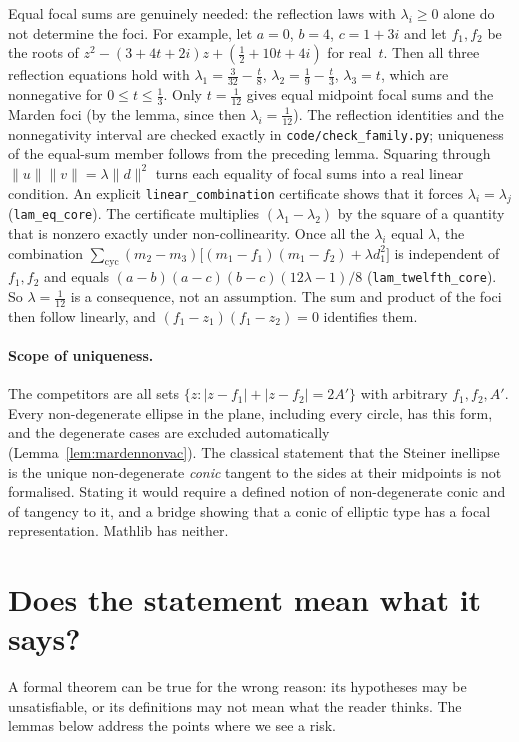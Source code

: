 \documentclass[11pt]{article}
\theoremstyle{remark}
\newcommand{\lean}[1]{\texttt{#1}}
\newcommand{\nm}[1]{\lVert #1\rVert}
\begin{document}
Equal focal sums are genuinely needed: the reflection laws with $\lambda_i\ge0$ alone do not
determine the foci. For example, let $a=0$, $b=4$, $c=1+3i$ and let $f_1,f_2$ be the roots of
$z^2-(3+4t+2i)z+(\frac12+10t+4i)$ for real~$t$. Then all three reflection equations hold with
$\lambda_1=\frac3{32}-\frac t8$, $\lambda_2=\frac19-\frac t3$, $\lambda_3=t$, which are
nonnegative for $0\le t\le\frac13$. Only $t=\frac1{12}$ gives equal midpoint focal sums and the
Marden foci (by the lemma, since then $\lambda_i=\frac1{12}$). The reflection identities and the nonnegativity interval are checked exactly in \texttt{code/check\_family.py}; uniqueness of the equal-sum member follows from the preceding lemma. Squaring through
$\nm u\nm v=\lambda\nm d^2$ turns each equality of focal sums into a real linear condition. An
explicit \lean{linear\_combination} certificate shows that it forces $\lambda_i=\lambda_j$
(\lean{lam\_eq\_core}). The certificate multiplies $(\lambda_1-\lambda_2)$ by the square of a quantity
that is nonzero exactly under non-collinearity. Once all the $\lambda_i$ equal $\lambda$, the combination
$\sum_{\mathrm{cyc}}(m_2-m_3)\bigl[(m_1-f_1)(m_1-f_2)+\lambda d_1^2\bigr]$ is independent of
$f_1,f_2$ and equals $(a-b)(a-c)(b-c)(12\lambda-1)/8$ (\lean{lam\_twelfth\_core}). So
$\lambda=\frac1{12}$ is a consequence, not an assumption. The sum and product of the foci then follow
linearly, and $(f_1-z_1)(f_1-z_2)=0$ identifies them.

\paragraph{Scope of uniqueness.} The competitors are all sets
$\{z:|z-f_1|+|z-f_2|=2A'\}$ with arbitrary $f_1,f_2,A'$. Every non-degenerate ellipse in the plane,
including every circle, has this form, and the degenerate cases are excluded automatically
(Lemma~\ref{lem:mardennonvac}). The classical statement that the Steiner inellipse is the unique
non-degenerate \emph{conic} tangent to the sides at their midpoints is not formalised. Stating it would require a
defined notion of non-degenerate conic and of tangency to it, and a bridge showing that a conic of elliptic type has a focal
representation. Mathlib has neither.

\section{Does the statement mean what it says?}\label{sec:correct}

A formal theorem can be true for the wrong reason: its hypotheses may be unsatisfiable, or its
definitions may not mean what the reader thinks. The lemmas below address the points where we
see a risk.
\end{document}
